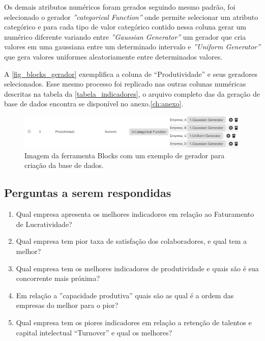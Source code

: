\documentclass[
	12pt,				%
	openright,			%
	oneside,			%
	a4paper,			%
	english,			%
	brazil				%
	]{abntex2}
\begin{document}
Os demais atributos numéricos foram gerados seguindo mesmo padrão, foi selecionado o gerador \textit{''categorical Function''} onde permite selecionar um atributo categórico e para cada tipo de valor categórico contido nessa coluna gerar um numérico diferente variando entre \textit{''Gaussian Generator''} um gerador que cria valores em uma gaussiana entre um determinado intervalo e \textit{''Uniform Generator''} que gera valores uniformes aleatoriamente entre determinados valores. 

A \autoref{fig_blocks_gerador} exemplifica a coluna de “Produtividade” e seus geradores selecionados. Esse mesmo processo foi replicado nas outras colunas numéricas descritas na tabela da \autoref{tabela_indicadores}, o arquivo completo das da geração de base de dados encontra se disponível no anexo.\ref{ch:anexo}.

\begin{figure}[!htb]
	\caption{\label{fig_blocks_gerador} Imagem da ferramenta Blocks com um exemplo de gerador para criação da base de dados.
}
	\begin{center}
	    \includegraphics[width=\textwidth]{figures/geradorBlocks.png}
	\end{center}
\end{figure}

\subsection{Perguntas a serem respondidas}
\begin{enumerate}
    \item Qual empresa apresenta os melhores indicadores em relação ao Faturamento de Lucratividade?
    

    \item Qual empresa tem pior taxa de satisfação dos colaboradores, e qual tem a melhor?
    

    \item Qual empresa tem os melhores indicadores de produtividade e quais são é sua concorrente mais próxima?

    
    \item Em relação a ''capacidade produtiva'' quais são as qual é a ordem das empresas do melhor para o pior?
    

    \item Qual empresa tem os piores indicadores em relação a retenção de talentos e capital intelectual “Turnover” e qual os melhores?
    
    
    
    
\end{enumerate}
\end{document}

